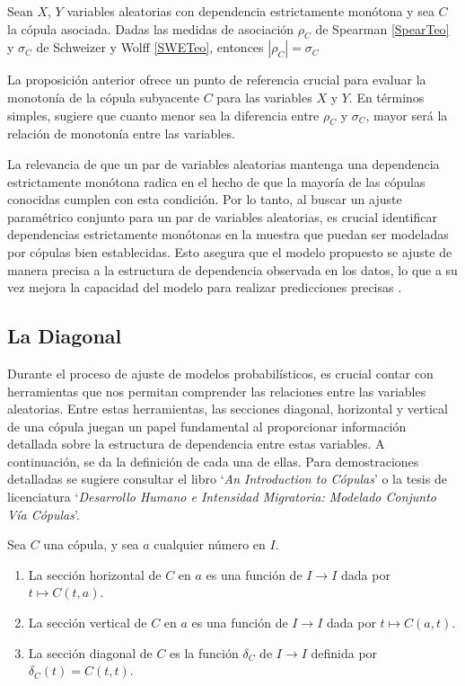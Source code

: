 \begin{propo}
    Sean $X$, $Y$ variables aleatorias con dependencia estrictamente monótona y sea $C$ la cópula asociada. Dadas las medidas de asociación $\rho_C$ de Spearman \eqref{SpearTeo} y $\sigma_C$ de Schweizer y Wolff \eqref{SWETeo}, entonces $|\rho_C| = \sigma_C$
\end{propo}

La proposición anterior ofrece un punto de referencia crucial para evaluar la monotonía de la cópula subyacente $C$ para las variables $X$ y $Y$. En términos simples, sugiere que cuanto menor sea la diferencia entre $\rho_C$ y $\sigma_C$, mayor será la relación de monotonía entre las variables.

La relevancia de que un par de variables aleatorias mantenga una dependencia estrictamente monótona radica en el hecho de que la mayoría de las cópulas conocidas cumplen con esta condición. Por lo tanto, al buscar un ajuste paramétrico conjunto para un par de variables aleatorias, es crucial identificar dependencias estrictamente monótonas en la muestra que puedan ser modeladas por cópulas bien establecidas. Esto asegura que el modelo propuesto se ajuste de manera precisa a la estructura de dependencia observada en los datos, lo que a su vez mejora la capacidad del modelo para realizar predicciones precisas \cite[pág. 43]{TesisEmanuel}.



\subsection{La Diagonal}

Durante el proceso de ajuste de modelos probabilísticos, es crucial contar con herramientas que nos permitan comprender las relaciones entre las variables aleatorias. Entre estas herramientas, las secciones diagonal, horizontal y vertical de una cópula juegan un papel fundamental al proporcionar información detallada sobre la estructura de dependencia entre estas variables. A continuación, se da la definición de cada una de ellas. Para demostraciones detalladas se sugiere consultar el libro `\textit{An Introduction to Cópulas}' \cite{nelsenintroduction} o la tesis de licenciatura `\textit{Desarrollo Humano e Intensidad Migratoria: Modelado Conjunto Vía Cópulas}'\cite{TesisEmanuel}.

\begin{defn}
    Sea $C$ una cópula, y sea $a$ cualquier número en $I$. 
    \begin{enumerate}
        \item La sección horizontal de $C$ en $a$ es una función de $I \to I$ dada por $ t \mapsto C(t, a)$. 
        \item La sección vertical de $C$ en $a$ es una función de $I \to I$ dada por $ t \mapsto C(a, t)$.
        \item La sección diagonal de $C$ es la función $\delta_C$ de $I \to I$ definida por $\delta_C(t) = C(t,t)$.
    \end{enumerate}
\end{defn}

